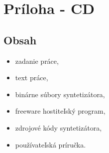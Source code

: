 \thispagestyle{empty}
\vspace*{6cm}

\section*{Príloha - CD}

\subsection*{Obsah}

\begin{itemize}
\setlength{\itemsep}{-0.5ex}
\item zadanie práce,
\item text práce,
\item binárne súbory syntetizátora,
\item freeware hostiteľský program,
\item zdrojové kódy syntetizátora,
\item používateľská príručka.
\end{itemize}
